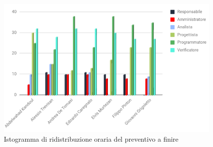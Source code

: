 \clearpage		
\begin{figure}[h!]
	\centering
	\caption{Istogramma di ridistribuzione oraria del preventivo a finire}
    \includegraphics[width=1\textwidth]{./src/Preventivo/src/img/IstoPreventivoaFinireProj.png}  
\end{figure} 

